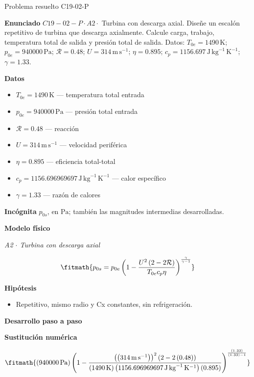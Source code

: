 \documentclass[10pt,openany]{book}
\begin{document}
\begin{studiumworked}{Problema resuelto C19-02-P}


\noindent\textbf{Enunciado}
\(C19-02-P \cdot A2 \cdot\) Turbina con descarga axial. Diseñe un escalón repetitivo de turbina que descarga axialmente. Calcule carga, trabajo, temperatura total de salida y presión total de salida. Datos: \(T_{0e}=1490\, \mathrm{K}\); \(p_{0e}=940000\, \mathrm{Pa}\); \(\mathcal R=0.48\); \(U=314\, \mathrm{m}\,\mathrm{s}^{-1}\); \(\eta=0.895\); \(c_p=1156.697\, \mathrm{J}\,\mathrm{kg}^{-1}\,\mathrm{K}^{-1}\); \(\gamma=1.33\).

\noindent\textbf{Datos}
\begin{itemize}
\item $T_{0e} = 1490\,\mathrm{K}$ — temperatura total entrada
\item $p_{0e} = 940000\,\mathrm{Pa}$ — presión total entrada
\item $\mathcal R = 0.48$ — reacción
\item $U = 314\,\mathrm{m}\,\mathrm{s}^{-1}$ — velocidad periférica
\item $\eta = 0.895$ — eficiencia total-total
\item $c_p = 1156.696969697\,\mathrm{J}\,\mathrm{kg}^{-1}\,\mathrm{K}^{-1}$ — calor específico
\item $\gamma = 1.33$ — razón de calores
\end{itemize}

\noindent\textbf{Incógnita}
$p_{0s}$, en $\mathrm{Pa}$; también las magnitudes intermedias desarrolladas.

\noindent\textbf{Modelo físico}

\noindent\textit{A2 \(\cdot\) Turbina con descarga axial}

\[
\fitmath{p_{0s}=p_{0e} \left(1 - \frac{U^{2} \left(2 - 2 \mathcal R\right)}{T_{0e} c_p \eta}\right)^{\frac{\gamma}{\gamma - 1}}}
\]

\noindent\textbf{Hipótesis}
\begin{itemize}
\item Repetitivo, mismo radio y Cx constantes, sin refrigeración.
\end{itemize}

\noindent\textbf{Desarrollo paso a paso}



\noindent\textbf{Sustitución numérica}

\[
\fitmath{\left(940000\,\mathrm{Pa}\right) \left(1 - \frac{\left(\left(314\,\mathrm{m}\,\mathrm{s}^{-1}\right)\right)^{2} \left(2 - 2 \left(0.48\right)\right)}{\left(1490\,\mathrm{K}\right) \left(1156.696969697\,\mathrm{J}\,\mathrm{kg}^{-1}\,\mathrm{K}^{-1}\right) \left(0.895\right)}\right)^{\frac{\left(1.33\right)}{\left(1.33\right) - 1}}}
\]


\end{studiumworked}
\end{document}
